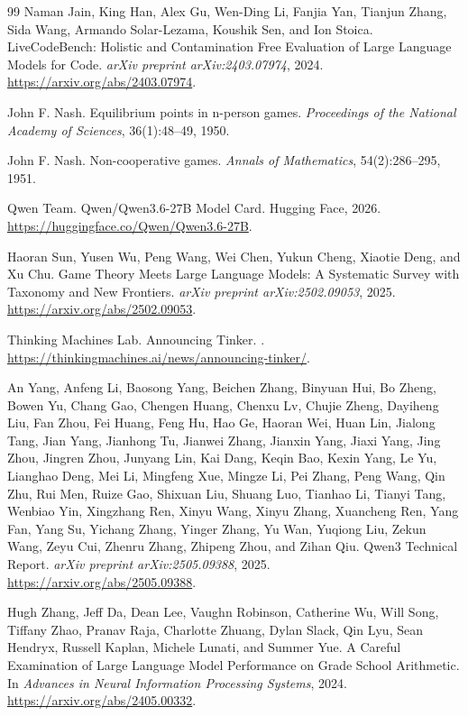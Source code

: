 \documentclass[11pt]{article}
\begin{document}
\begin{thebibliography}{99}
Naman Jain, King Han, Alex Gu, Wen-Ding Li, Fanjia Yan, Tianjun Zhang, Sida Wang, Armando Solar-Lezama, Koushik Sen, and Ion Stoica.
\newblock LiveCodeBench: Holistic and Contamination Free Evaluation of Large Language Models for Code.
\newblock \emph{arXiv preprint arXiv:2403.07974}, 2024.
\newblock \url{https://arxiv.org/abs/2403.07974}.

John F. Nash.
\newblock Equilibrium points in n-person games.
\newblock \emph{Proceedings of the National Academy of Sciences}, 36(1):48--49, 1950.

John F. Nash.
\newblock Non-cooperative games.
\newblock \emph{Annals of Mathematics}, 54(2):286--295, 1951.

Qwen Team.
\newblock Qwen/Qwen3.6-27B Model Card.
\newblock Hugging Face, 2026.
\newblock \url{https://huggingface.co/Qwen/Qwen3.6-27B}.

Haoran Sun, Yusen Wu, Peng Wang, Wei Chen, Yukun Cheng, Xiaotie Deng, and Xu Chu.
\newblock Game Theory Meets Large Language Models: A Systematic Survey with Taxonomy and New Frontiers.
\newblock \emph{arXiv preprint arXiv:2502.09053}, 2025.
\newblock \url{https://arxiv.org/abs/2502.09053}.

Thinking Machines Lab.
\newblock Announcing Tinker.
.
\newblock \url{https://thinkingmachines.ai/news/announcing-tinker/}.

An Yang, Anfeng Li, Baosong Yang, Beichen Zhang, Binyuan Hui, Bo Zheng, Bowen Yu, Chang Gao, Chengen Huang, Chenxu Lv, Chujie Zheng, Dayiheng Liu, Fan Zhou, Fei Huang, Feng Hu, Hao Ge, Haoran Wei, Huan Lin, Jialong Tang, Jian Yang, Jianhong Tu, Jianwei Zhang, Jianxin Yang, Jiaxi Yang, Jing Zhou, Jingren Zhou, Junyang Lin, Kai Dang, Keqin Bao, Kexin Yang, Le Yu, Lianghao Deng, Mei Li, Mingfeng Xue, Mingze Li, Pei Zhang, Peng Wang, Qin Zhu, Rui Men, Ruize Gao, Shixuan Liu, Shuang Luo, Tianhao Li, Tianyi Tang, Wenbiao Yin, Xingzhang Ren, Xinyu Wang, Xinyu Zhang, Xuancheng Ren, Yang Fan, Yang Su, Yichang Zhang, Yinger Zhang, Yu Wan, Yuqiong Liu, Zekun Wang, Zeyu Cui, Zhenru Zhang, Zhipeng Zhou, and Zihan Qiu.
\newblock Qwen3 Technical Report.
\newblock \emph{arXiv preprint arXiv:2505.09388}, 2025.
\newblock \url{https://arxiv.org/abs/2505.09388}.

Hugh Zhang, Jeff Da, Dean Lee, Vaughn Robinson, Catherine Wu, Will Song, Tiffany Zhao, Pranav Raja, Charlotte Zhuang, Dylan Slack, Qin Lyu, Sean Hendryx, Russell Kaplan, Michele Lunati, and Summer Yue.
\newblock A Careful Examination of Large Language Model Performance on Grade School Arithmetic.
\newblock In \emph{Advances in Neural Information Processing Systems}, 2024.
\newblock \url{https://arxiv.org/abs/2405.00332}.

\end{thebibliography}
\endgroup
\end{document}
